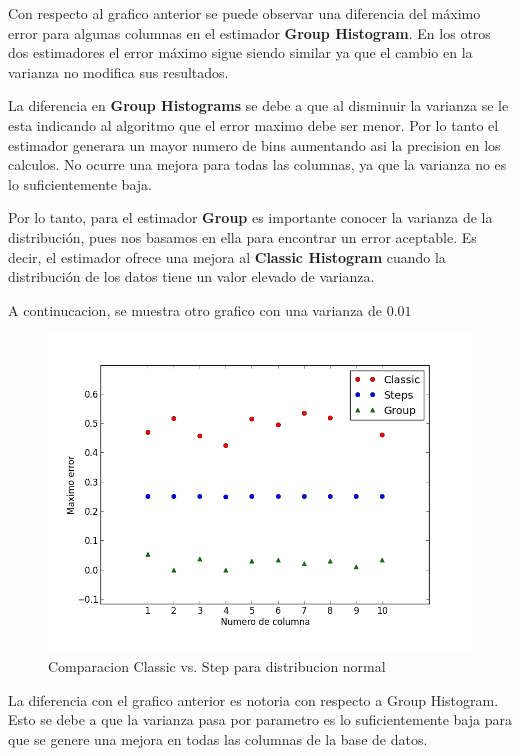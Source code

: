 \documentclass[10pt, a4paper,english,spanish,hidelinks]{article}
\begin{document}
{{Con respecto al grafico anterior se puede observar una diferencia del máximo error para algunas columnas en el estimador \textbf{Group Histogram}. En los otros dos estimadores el error máximo sigue siendo similar ya que el cambio en la varianza no modifica sus resultados. 

La diferencia en \textbf{Group Histograms} se debe a que al disminuir la varianza se le esta indicando al algoritmo que el error maximo debe ser menor. Por lo tanto el estimador generara un mayor numero de bins aumentando asi la precision en los calculos. No ocurre una mejora para todas las columnas, ya que la varianza no es lo suficientemente baja. 

Por lo tanto, para el estimador \textbf{Group} es importante conocer la varianza de la distribución, pues nos
basamos en ella para encontrar un error aceptable. Es decir, el estimador ofrece una mejora al \textbf{Classic Histogram} cuando la distribución de los datos tiene un valor elevado de varianza.

A continucacion, se muestra otro grafico con una varianza de $0.01$
\newpage
\begin{figure}
  \centering
  \includegraphics[scale=0.6]{./imagenes/ejb2_normal_t_001.png}
  \caption{Comparacion Classic vs. Step para distribucion normal}
\end{figure}

La diferencia con el grafico anterior es notoria con respecto a Group Histogram. Esto se debe a que la varianza pasa por parametro es lo suficientemente baja para que se genere una mejora en todas las columnas de la base de datos. 



}}
\end{document}
